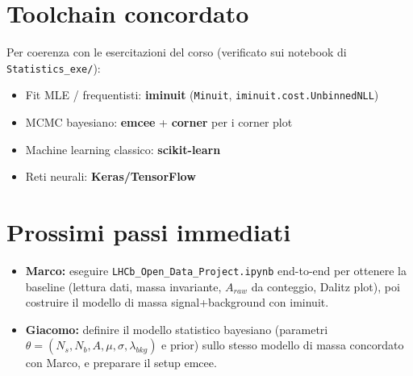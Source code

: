 \documentclass[11pt,a4paper]{article}
\begin{document}
\section{Toolchain concordato}

Per coerenza con le esercitazioni del corso (verificato sui notebook di \texttt{Statistics\_exe/}):

\begin{itemize}[leftmargin=1.4em]
    \item Fit MLE / frequentisti: \textbf{iminuit} (\texttt{Minuit}, \texttt{iminuit.cost.UnbinnedNLL})
    \item MCMC bayesiano: \textbf{emcee} + \textbf{corner} per i corner plot
    \item Machine learning classico: \textbf{scikit-learn}
    \item Reti neurali: \textbf{Keras/TensorFlow}
\end{itemize}

\section{Prossimi passi immediati}

\begin{itemize}[leftmargin=1.4em]
    \item \textbf{Marco:} eseguire \texttt{LHCb\_Open\_Data\_Project.ipynb} end-to-end per ottenere la baseline (lettura dati, massa invariante, $A_{raw}$ da conteggio, Dalitz plot), poi costruire il modello di massa signal+background con iminuit.
    \item \textbf{Giacomo:} definire il modello statistico bayesiano (parametri $\theta = (N_s, N_b, A, \mu, \sigma, \lambda_{bkg})$ e prior) sullo stesso modello di massa concordato con Marco, e preparare il setup emcee.
\end{itemize}
\end{document}
